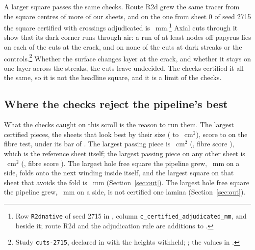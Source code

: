 A larger square passes the same checks. Route R2d grew the same tracer from the square centres of more of our
sheets, and on the one from sheet 0 of seed 2715 the square certified with crossings adjudicated is
\RdSquare{}~mm.\footnote{Row \texttt{R2dnative} of seed 2715 in
, column \texttt{c\_certified\_adjudicated\_mm}, and
 beside it; route R2d and the adjudication rule are additions to
.} Axial cuts
through it show that its dark corner runs through air: a run of at least \CutsVoidRun{} nodes off papyrus lies on each
of the \CutsRdCrack{} cuts at the crack, and on none of the \CutsRdStreaks{} cuts at dark streaks or the
\CutsRdControls{} controls.\footnote{Study \texttt{cuts-2715}, declared in  with the
heights withheld; ; the values in .} Whether the surface changes layer
at the crack, and whether it stays on one layer across the streaks, the cuts leave undecided. The checks certified it
all the same, so it is not the headline square, and it is a limit of the checks.

\subsection{Where the checks reject the pipeline's best}

What the checks caught on this scroll is the reason to run them. The \FibreTopFailCount{} largest certified pieces,
the sheets that look best by their size (\FibreTopFailPieceMin{} to \FibreTopFailPieceMax{}~cm$^2$), score
\FibreTopFailScoreMin{} to \FibreTopFailScoreMax{} on the fibre test, under its bar of \FibreBar{}. The largest
passing piece is \FibreBestPiece{}~cm$^2$ (\FibreBestPieceSheet{}, fibre score \FibreBestPieceScore{}), which is the
reference sheet itself; the largest passing piece on any other sheet is \FibreBestOtherPiece{}~cm$^2$
(\FibreBestOtherPieceSheet{}, fibre score \FibreBestOtherPieceScore{}).
\ifSquareChecksCrossing
The largest hole free square the pipeline grew, \RegrowBest{}~mm on a side, folds onto the next winding inside itself,
and the largest square on that sheet that avoids the fold is \CheckLaminaAvoid{}~mm (Section~\ref{sec:out}).
\else
The largest hole free square the pipeline grew, \RegrowBest{}~mm on a side, is not certified one lamina
(Section~\ref{sec:out}).
\fi

